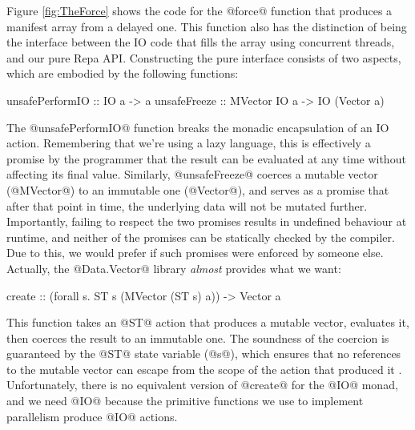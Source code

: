 Figure \ref{fig:TheForce} shows the code for the @force@ function that produces a manifest array from a delayed one. This function also has the distinction of being the interface between the IO code that fills the array using concurrent threads, and our pure Repa API. Constructing the pure interface consists of two aspects, which are embodied by the following functions:
\par
\begin{small}
\begin{code}
 unsafePerformIO :: IO a -> a
 unsafeFreeze    :: MVector IO a -> IO (Vector a)
\end{code}
\end{small}
\par
The @unsafePerformIO@ function breaks the monadic encapsulation of an IO action. Remembering that we're using a lazy language, this is effectively a promise by the programmer that the result can be evaluated at any time without affecting its final value. Similarly, @unsafeFreeze@ coerces a mutable vector (@MVector@) to an immutable one (@Vector@), and serves as a promise that after that point in time, the underlying data will not be mutated further. Importantly, failing to respect the two promises results in undefined behaviour at runtime, and neither of the promises can be statically checked by the compiler. Due to this, we would prefer if such promises were enforced by someone else. Actually, the @Data.Vector@ library \emph{almost} provides what we want:
\par
\begin{small}
\begin{code}
create :: (forall s. ST s (MVector (ST s) a)) -> Vector a
\end{code}
\end{small}
\par
This function takes an @ST@ action that produces a mutable vector, evaluates it, then coerces the result to an immutable one. The soundness of the coercion is guaranteed by the @ST@ state variable (@s@), which ensures that no references to the mutable vector can escape from the scope of the action that produced it \cite{Launchbury:state-threads}. Unfortunately, there is no equivalent version of @create@ for the @IO@ monad, and we need @IO@ because the primitive functions we use to implement parallelism produce @IO@ actions. 

